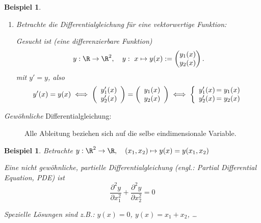 \documentclass[
]{mycourse}
\theoremstyle{mythm}
\newtheorem{beispiel}[theorem]{Beispiel}
\theoremstyle{break}
\begin{document}
\begin{beispiel}
\begin{enumerate}
\begin{itemize}
\begin{align*}
y_1(x)& = \sin(x)\\
y_2(x)& = 37\\
y_3(x)& = 0
\end{align*}
\item Die \emph{allgemeine} Lösung ist
\begin{align*}
y_1(x)& = C_1 \sin(x) + C_2 \cos(x)\\
y_2(x)& = C_3 e^x+C_4\\
y_3(x)& = C_3 e^x\\
\end{align*}
mit $C_1,\ldots,C_4\in \R.$
\end{itemize}
%
\item[(e)] Betrachte die Differentialgleichung für eine \emph{vektorwertige} Funktion:

Gesucht ist (eine differenzierbare Funktion) 
\[
y: \R \to \R^2,\quad y:\ x\mapsto y(x):=\begin{pmatrix} y_1(x)\\ y_2(x) \end{pmatrix}.
\]
mit $y'=y$, also
\[
y'(x)=y(x) \;  \Longleftrightarrow \;
\left( \begin{array}{c} y_1'(x)\\ y_2'(x) \end{array} \right)= \left( \begin{array}{c} y_1(x)\\ y_2(x) \end{array} \right)
\;  \Longleftrightarrow \;
\left\{ \begin{array}{r@{\,}  l}
y_1'(x)&=y_1(x)\\  y_2'(x)&=y_2(x)
\end{array} \right.
\]
\end{enumerate}
\end{beispiel}



\begin{description}
\item[\emph{Gewöhnliche} Differentialgleichung:] Alle Ableitung beziehen sich auf die selbe eindimensionale Variable.
\end{description}

\begin{beispiel}
Betrachte $y:\R^2 \to \R, \quad (x_1,x_2)\mapsto y(x)=y(x_1,x_2)$

Eine nicht gewöhnliche, \emph{partielle} Differentialgleichung (engl.: Partial Differential Equation, PDE) ist 
\[
\frac{\partial^2 y}{\partial x_1^2}+\frac{\partial^2 y}{\partial x_2^2}=0
\]

\emph{Spezielle} Lösungen sind z.B.:  $y(x)=0$, $y(x)=x_1+x_2$, \ldots
\end{beispiel}
\end{document}
